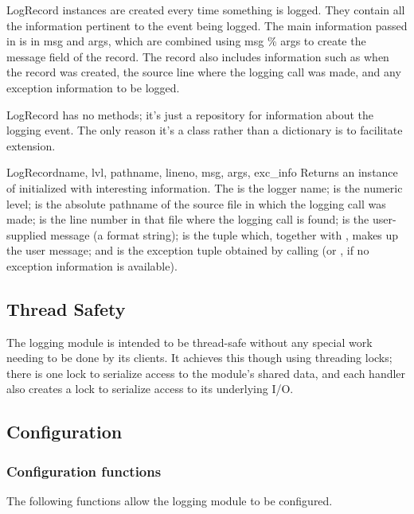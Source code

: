 LogRecord instances are created every time something is logged. They
contain all the information pertinent to the event being logged. The
main information passed in is in msg and args, which are combined
using msg \% args to create the message field of the record. The record
also includes information such as when the record was created, the
source line where the logging call was made, and any exception
information to be logged.

LogRecord has no methods; it's just a repository for information about the
logging event. The only reason it's a class rather than a dictionary is to
facilitate extension.

\begin{classdesc}{LogRecord}{name, lvl, pathname, lineno, msg, args,
			     exc_info}
Returns an instance of  initialized with interesting
information. The  is the logger name;  is the
numeric level;  is the absolute pathname of the source
file in which the logging call was made;  is the line
number in that file where the logging call is found;  is the
user-supplied message (a format string);  is the tuple
which, together with , makes up the user message; and
 is the exception tuple obtained by calling
(or , if no exception information
is available).
\end{classdesc}

\subsection{Thread Safety}

The logging module is intended to be thread-safe without any special work
needing to be done by its clients. It achieves this though using threading
locks; there is one lock to serialize access to the module's shared data,
and each handler also creates a lock to serialize access to its underlying
I/O.

\subsection{Configuration}


\subsubsection{Configuration functions}

The following functions allow the logging module to be configured.

